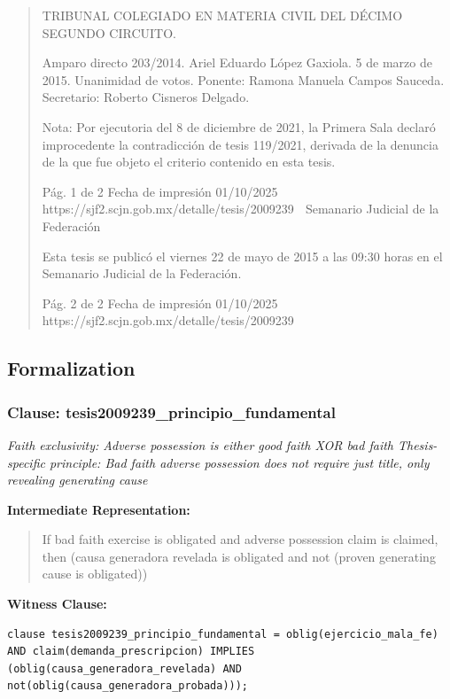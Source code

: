 \documentclass[11pt,a4paper]{article}
\begin{document}
\begin{quote}
TRIBUNAL COLEGIADO EN MATERIA CIVIL DEL DÉCIMO SEGUNDO CIRCUITO.


Amparo directo 203/2014. Ariel Eduardo López Gaxiola. 5 de marzo de 2015. Unanimidad de votos.
Ponente: Ramona Manuela Campos Sauceda. Secretario: Roberto Cisneros Delgado.

Nota: Por ejecutoria del 8 de diciembre de 2021, la Primera Sala declaró improcedente la
contradicción de tesis 119/2021, derivada de la denuncia de la que fue objeto el criterio contenido
en esta tesis.




                                              Pág. 1 de 2             Fecha de impresión 01/10/2025
  https://sjf2.scjn.gob.mx/detalle/tesis/2009239
                                                  Semanario Judicial de la Federación


Esta tesis se publicó el viernes 22 de mayo de 2015 a las 09:30 horas en el Semanario Judicial de
la Federación.




                                             Pág. 2 de 2          Fecha de impresión 01/10/2025
 https://sjf2.scjn.gob.mx/detalle/tesis/2009239

\end{quote}

\subsection{Formalization}

\subsubsection{Clause: tesis2009239\_principio\_fundamental}

\textit{Faith exclusivity: Adverse possession is either good faith XOR bad faith Thesis-specific principle: Bad faith adverse possession does not require just title, only revealing generating cause}

\textbf{Intermediate Representation:}

\begin{quote}
If bad faith exercise is obligated and adverse possession claim is claimed, then (causa generadora revelada is obligated and not (proven generating cause is obligated))
\end{quote}

\textbf{Witness Clause:}

\begin{lstlisting}[style=witnessstyle, language=Witness]
clause tesis2009239_principio_fundamental = oblig(ejercicio_mala_fe) AND claim(demanda_prescripcion) IMPLIES (oblig(causa_generadora_revelada) AND not(oblig(causa_generadora_probada)));
\end{lstlisting}
\end{document}
